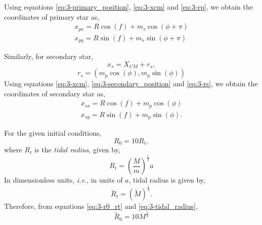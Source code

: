 \documentclass[a4paper]{article}
\begin{document}
\begin{enumerate} [label*=\textbf{(\alph*)}]
					Using equations \ref{eq:3-primary_position}, \ref{eq:3-xcm} and \ref{eq:3-rp}, we obtain the coordinates of primary star as,
					\begin{equation}
						\begin{gathered}
							x_{px} = R \cos(f) + m_s \cos(\phi+\pi) \\
							x_{py} = R \sin(f) + m_s \sin(\phi+\pi)
						\end{gathered}
						\label{eq:3-primary_positions_xy}
					\end{equation}
					
					Similarly, for secondary star,
					\begin{equation}
						x_s = X_{CM}^{} + r_s,
						\label{eq:3-secondary_position}
					\end{equation}
					\begin{equation}
						r_s = (m_p \cos(\phi), m_p \sin(\phi))
						\label{eq:3-rs}
					\end{equation}
					Using equations \ref{eq:3-xcm}, \ref{eq:3-secondary_position} and \ref{eq:3-rs}, we obtain the coordinates of secondary star as,
					\begin{equation}
						\begin{gathered}
							x_{sx} = R \cos(f) + m_p \cos(\phi) \\
							x_{sy} = R \sin(f) + m_p \sin(\phi).
						\end{gathered}
					\end{equation}
				
					For the given initial conditions,
					\begin{equation}
						R_0 = 10 R_t,
						\label{eq:3-r0_rt}
					\end{equation}
					where \(R_t\) is the \emph{tidal radius}, given by,
					\begin{equation}
						\nonumber R_t^{} = \left( \frac{M}{m} \right)^{\frac{1}{3}} a
					\end{equation}
					In dimensionless units, \textit{i.e.}, in units of \(a\), tidal radius is given by,
					\begin{equation}
						\tilde{R}_t = \left( \tilde{M} \right)^{\frac{1}{3}}.
						\label{eq:3-tidal_radius}
					\end{equation}
					Therefore, from equations \ref{eq:3-r0_rt} and \ref{eq:3-tidal_radius},
					\begin{equation}
						\tilde{R}_0 = 10 M^{\frac{1}{3}}	
						\label{eq:3-r0_m}
					\end{equation}
					

\end{enumerate}
\end{document}
